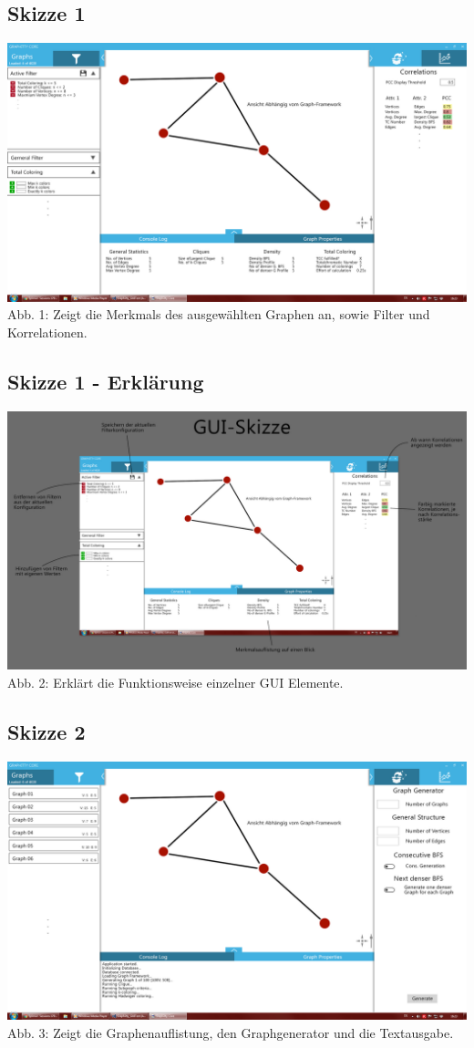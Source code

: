 \documentclass[13pt]{scrreprt}
\begin{document}
\subsection{Skizze 1}
    \includegraphics[scale=0.21]{IDE1.jpg}
	\centering Abb. 1: Zeigt die \Glspl{Merkmal} des ausgewählten Graphen an, sowie Filter und Korrelationen.
	\\
\subsection{Skizze 1 - Erklärung}
    \includegraphics[scale=0.21]{IDE1A.jpg} 
	\centering Abb. 2: Erklärt die Funktionsweise einzelner GUI Elemente.
	\\
\subsection{Skizze 2}
    \includegraphics[scale=0.21]{IDE2.jpg}
	\centering Abb. 3: Zeigt die Graphenauflistung, den Graphgenerator und die Textausgabe.
	\\
\end{document}
